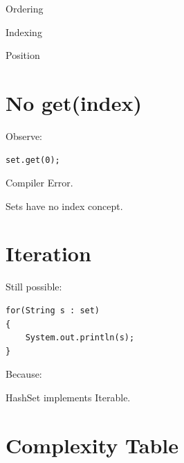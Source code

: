 \documentclass[11pt,a4paper]{book}
\begin{document}

Ordering


Indexing


Position


\section{No get(index)}

Observe:

\begin{verbatim} 
set.get(0);
\end{verbatim}


Compiler Error.


Sets have no index concept.


\section{Iteration}

Still possible:

\begin{verbatim} 
for(String s : set)
{
    System.out.println(s);
}
\end{verbatim}


Because:


HashSet implements Iterable.


\section{Complexity Table}
\end{document}
